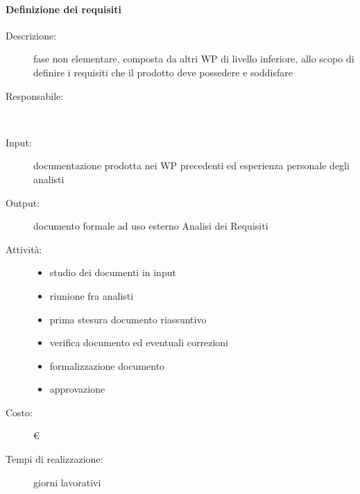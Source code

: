 \paragraph{Definizione dei requisiti}
\begin{description}
\item[Descrizione:] fase non elementare, composta da altri WP di livello inferiore, allo scopo di definire i requisiti che il prodotto deve possedere e soddisfare\\

\item[Responsabile:] \\

\item[Input:] documentazione prodotta nei WP precedenti ed esperienza personale degli
analisti\\

\item[Output:] documento formale ad uso esterno Analisi dei Requisiti\\

\item[Attività:]
\begin{itemize}
\item studio dei documenti in input
\item riunione fra analisti
\item prima stesura documento riassuntivo
\item verifica documento ed eventuali correzioni
\item formalizzazione documento
\item approvazione
\end{itemize}
\item[Costo:] \euro \\
\item[Tempi di realizzazione:]  giorni lavorativi
\end{description}



